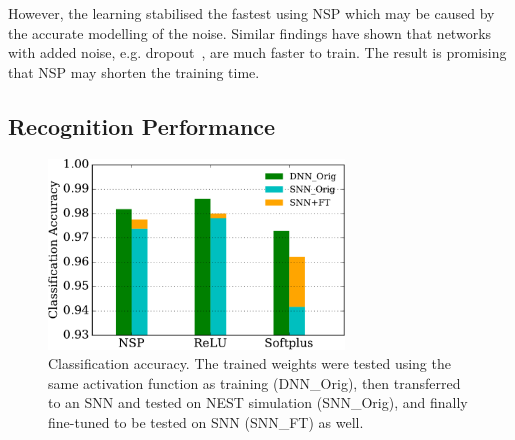 	However, the learning stabilised the fastest using NSP which may be caused by the accurate modelling of the noise.
	Similar findings have shown that networks with added noise, e.g. dropout~\DIFdelbegin {}\DIFdelend \DIFaddbegin {}\DIFaddend , are much faster to train. 
	The result is promising that NSP may shorten the training time.
\DIFdelbegin %
{%
}
\DIFdelend \DIFaddbegin 

\DIFaddend %

\subsection{Recognition Performance}
\label{subsec:result_compare_rec}
	\begin{figure}[tbp!]
		\centering
		\includegraphics[width=0.7\textwidth]{pics_iconip/9-2.pdf}
		\DIFdelbeginFL %
\DIFdelendFL \DIFaddbeginFL \caption[Classification accuracy.]{\DIFaddendFL Classification accuracy.
			The trained weights were tested using the same activation function as training (DNN\_Orig), then transferred to an SNN and tested on NEST simulation (SNN\_Orig), and finally fine-tuned to be tested on SNN (SNN\_FT) as well.  }
		\label{Fig:result_bar}
	\end{figure}

